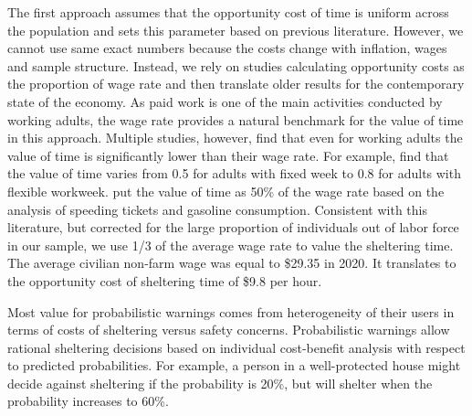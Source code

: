 \documentclass{ametsocV6.1}
\begin{document}
The first approach assumes that the opportunity cost of time is uniform across the population and sets this parameter based on previous literature. However, we cannot use same exact numbers because the costs change with inflation, wages and sample structure. Instead, we rely on studies calculating opportunity costs as the proportion of wage rate and then translate older results for the contemporary state of the economy. As paid work is one of the main activities conducted by working adults, the wage rate provides a natural benchmark for the value of time in this approach. Multiple studies, however, find that even for working adults the value of time is significantly lower than their wage rate. For example, \citet{larson_revealing_2004} find that the value of time varies from 0.5 for adults with fixed week to 0.8 for adults with flexible workweek. \citet{wolff_value_2014} put the value of time as 50\% of the wage rate based on the analysis of speeding tickets and gasoline consumption. Consistent with this literature, but corrected for the large proportion of individuals out of labor force in our sample, we use 1/3 of the average wage rate to value the sheltering time. The average civilian non-farm wage was equal to \$29.35 in 2020. It translates to the opportunity cost of sheltering time of \$9.8 per hour.

Most value for probabilistic warnings comes from heterogeneity of their users in terms of costs of sheltering versus safety concerns. Probabilistic warnings allow rational sheltering decisions based on individual cost-benefit analysis with respect to predicted probabilities. For example, a person in a well-protected house might decide against sheltering if the probability is 20\%, but will shelter when the probability increases to 60\%. 
\end{document}
